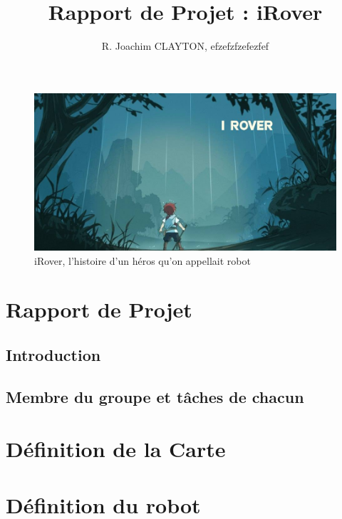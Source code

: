 \documentclass[a4paper 12pts]{article}
\title{Rapport de Projet : iRover}
\author{R. Joachim CLAYTON, efzefzfzefezfef}
\begin{document}
\maketitle


\begin{figure}[h]
   \includegraphics[width=350pt]{Illustration/proj_irover.jpg}
	\caption{iRover, l'histoire d'un héros qu'on appellait robot}
\end{figure}



\newpage


\renewcommand{\contentsname}{Sommaire} 
\tableofcontents

\newpage








\section{Rapport de Projet}


\vspace{2cm}



\subsection{Introduction}
\subsection{Membre du groupe et tâches de chacun}


\section{Définition de la Carte}



\section{Définition du robot}
\end{document}
